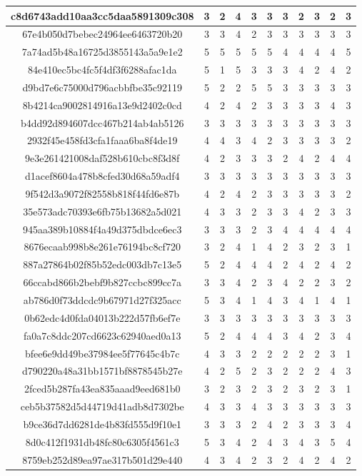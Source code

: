 \begin{longtable}{|c|c|c|c|c|c|c|c|c|c|c|}
\hline	c8d6743add10aa3cc5daa5891309c308	&	3	&	2	&	4	&	3	&	3	&	3	&	2	&	3	&	2	&	3	\\
\hline	67e4b050d7bebec24964ee6463720b20	&	3	&	3	&	4	&	2	&	3	&	3	&	3	&	3	&	3	&	3	\\
\hline	7a74ad5b48a16725d3855143a5a9e1e2	&	5	&	5	&	5	&	5	&	5	&	4	&	4	&	4	&	4	&	5	\\
\hline	84e410ec5bc4fc5f4df3f6288afac1da	&	5	&	1	&	5	&	3	&	3	&	3	&	4	&	2	&	4	&	2	\\
\hline	d9bd7e6c75000d796acbbfbe35c92119	&	5	&	2	&	2	&	5	&	5	&	3	&	3	&	3	&	3	&	3	\\
\hline	8b4214ca9002814916a13e9d2402c0cd	&	4	&	2	&	4	&	2	&	3	&	3	&	3	&	3	&	4	&	3	\\
\hline	b4dd92d894607dcc467b214ab4ab5126	&	3	&	3	&	3	&	3	&	3	&	3	&	3	&	3	&	3	&	3	\\
\hline	2932f45e458fd3cfa1faaa6ba8f4de19	&	4	&	4	&	3	&	4	&	2	&	3	&	3	&	3	&	3	&	2	\\
\hline	9e3e261421008daf528b610cbc8f3d8f	&	4	&	2	&	3	&	3	&	3	&	2	&	4	&	2	&	4	&	4	\\
\hline	d1acef8604a478b8cfed30d68a59adf4	&	3	&	3	&	3	&	3	&	3	&	3	&	3	&	3	&	3	&	3	\\
\hline	9f542d3a9072f82558b818f44fd6e87b	&	4	&	2	&	4	&	2	&	3	&	3	&	3	&	3	&	3	&	2	\\
\hline	35e573adc70393e6fb75b13682a5d021	&	4	&	3	&	3	&	2	&	3	&	3	&	4	&	2	&	3	&	3	\\
\hline	945aa389b10884f4a49d375dbdce6ec3	&	3	&	3	&	3	&	2	&	3	&	4	&	4	&	4	&	4	&	4	\\
\hline	8676ecaab998b8e261e76194bc8cf720	&	3	&	2	&	4	&	1	&	4	&	2	&	3	&	2	&	3	&	1	\\
\hline	887a27864b02f85b52edc003db7c13e5	&	5	&	2	&	4	&	4	&	4	&	2	&	4	&	2	&	4	&	2	\\
\hline	66ccabd866b2bebf9b827ccbc899cc7a	&	3	&	3	&	4	&	2	&	3	&	4	&	2	&	2	&	3	&	2	\\
\hline	ab786d0f73ddcdc9b67971d27f325acc	&	5	&	3	&	4	&	1	&	4	&	3	&	4	&	1	&	4	&	1	\\
\hline	0b62edc4d0fda04013b222d57fb6ef7e	&	3	&	3	&	3	&	3	&	3	&	3	&	3	&	3	&	3	&	3	\\
\hline	fa0a7c8ddc207cd6623c62940aed0a13	&	5	&	2	&	4	&	4	&	4	&	3	&	4	&	2	&	3	&	4	\\
\hline	bfee6e9dd49be37984ee5f77645c4b7c	&	4	&	3	&	3	&	2	&	2	&	2	&	2	&	2	&	3	&	1	\\
\hline	d790220a48a31bb1571bf8878545b27e	&	4	&	2	&	5	&	2	&	3	&	2	&	2	&	2	&	4	&	3	\\
\hline	2fced5b287fa43ea835aaad9eed681b0	&	3	&	2	&	3	&	2	&	3	&	2	&	3	&	2	&	3	&	1	\\
\hline	ceb5b37582d5d44719d41adb8d7302be	&	4	&	3	&	3	&	4	&	3	&	3	&	3	&	3	&	3	&	3	\\
\hline	b9ce36d7dd6281de4b83fd555d9f10e1	&	3	&	3	&	3	&	2	&	4	&	2	&	3	&	3	&	3	&	4	\\
\hline	8d0c412f1931db48fc80c6305f4561c3	&	5	&	3	&	4	&	2	&	4	&	3	&	4	&	3	&	5	&	4	\\
\hline	8759eb252d89ea97ae317b501d29e440	&	4	&	3	&	4	&	2	&	3	&	2	&	4	&	2	&	4	&	2	\\
\hline
\end{longtable}
